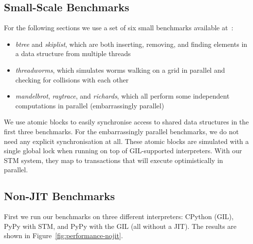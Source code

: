 \documentclass{sigplanconf}
\begin{document}
\subsection{Small-Scale Benchmarks\label{sec:performance-bench}}

For the following sections we use a set of six small benchmarks
available at~\cite{pypybenchs}:

\begin{itemize}
\item \emph{btree} and \emph{skiplist}, which are both inserting,
  removing, and finding elements in a data structure from multiple
  threads
\item \emph{threadworms}, which simulates worms walking on a grid in
  parallel and checking for collisions with each other
\item \emph{mandelbrot}, \emph{raytrace}, and \emph{richards}, which
  all perform some independent computations in parallel (embarrassingly
  parallel)
\end{itemize}

We use atomic blocks to easily synchronise access to shared
data structures in the first three benchmarks. For the embarrassingly
parallel benchmarks, we do not need any explicit synchronisation at
all. These atomic blocks are simulated with a single global lock
when running on top of GIL-supported interpreters. With our STM
system, they map to transactions that will execute optimistically
in parallel.









\subsection{Non-JIT Benchmarks}
First we run our benchmarks on three different interpreters: CPython
(GIL), PyPy with STM, and PyPy with the GIL (all without a JIT). The
results are shown in Figure~\ref{fig:performance-nojit}.
\end{document}
